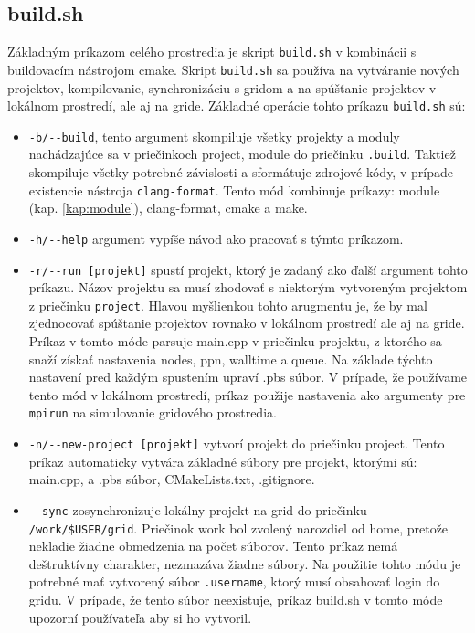 \subsection{build.sh}
Základným príkazom celého prostredia je skript \texttt{build.sh} v kombinácii s buildovacím nástrojom cmake.
Skript \texttt{build.sh} sa používa na vytváranie nových projektov, kompilovanie,
synchronizáciu s gridom a na spúšťanie projektov v lokálnom prostredí, ale aj na gride.
Základné operácie tohto príkazu \texttt{build.sh} sú:
\begin{itemize}
\item
  \texttt{-b/-{}-build}, tento argument skompiluje všetky projekty a moduly nachádzajúce sa v priečinkoch project, module do priečinku \texttt{.build}.
  Taktiež skompiluje všetky potrebné závislosti a sformátuje zdrojové kódy, v prípade existencie nástroja \texttt{clang-format}.
  Tento mód kombinuje príkazy: module (kap. \ref{kap:module}), clang-format, cmake a make.
\item
  \texttt{-h/-{}-help} argument vypíše návod ako pracovať s týmto príkazom.
\item
  \texttt{-r/-{}-run [projekt]} spustí projekt, ktorý je zadaný ako ďalší argument tohto príkazu.
  Názov projektu sa musí zhodovať s niektorým vytvoreným projektom z priečinku \texttt{project}.
  Hlavou myšlienkou tohto arugmentu je, že by mal zjednocovať spúštanie projektov rovnako v lokálnom prostredí ale aj na gride.
  Príkaz v tomto móde parsuje main.cpp v priečinku projektu, z ktorého sa snaží získať nastavenia nodes, ppn, walltime a queue.
  Na základe týchto nastavení pred každým spustením upraví .pbs súbor.
  V prípade, že používame tento mód v lokálnom prostredí,
  príkaz použije nastavenia ako argumenty pre \texttt{mpirun} na simulovanie gridového prostredia.
\item
  \texttt{-n/-{}-new-project [projekt]} vytvorí projekt do priečinku project.
  Tento príkaz automaticky vytvára základné súbory pre projekt, ktorými sú: main.cpp, a .pbs súbor, CMakeLists.txt, .gitignore.
\item
  \texttt{-{}-sync} zosynchronizuje lokálny projekt na grid do priečinku \texttt{/work/\$USER/grid}.
  Priečinok work bol zvolený narozdiel od home, pretože nekladie žiadne obmedzenia na počet súborov.
  Tento príkaz nemá deštruktívny charakter, nezmazáva žiadne súbory.
  Na použitie tohto módu je potrebné mať vytvorený súbor \texttt{.username}, ktorý musí obsahovať login do gridu.
  V prípade, že tento súbor neexistuje, príkaz build.sh v tomto móde upozorní používateľa aby si ho vytvoril.  
\end{itemize}

